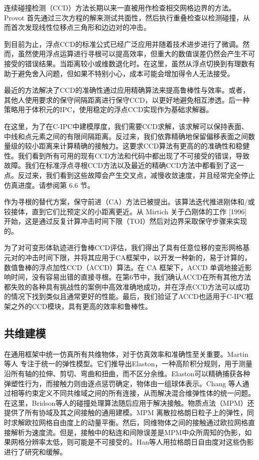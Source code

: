 连续碰撞检测（CCD）方法长期以来一直被用作检查相交网格边界的方法。Provot 首先通过三次方程的解来测试共面性，然后执行重叠检查以检测碰撞，从而首次发现线性位移点三角形和边边对的冲击。

到目前为止，浮点CCD的标准公式已经广泛应用并随着技术进步进行了微调。然而，虽然使用浮点运算进行寻根可以提高效率，但重大的数值误差仍然会产生不可接受的错误结果。当距离较小或维数退化时。在这里，虽然从浮点切换到有理数有助于避免舍入问题，但如果不特别小心，成本可能会增加得令人无法接受。

最近的方法解决了CCD的准确性通过应用精确算法来提高鲁棒性与效率。或者，其他人使用要求的保守间隔距离进行保守CCD，以更好地避免相互渗透。后一种策略用于体积元的IPC，使用稳定的浮点CCD实现作为基础求解器。

在这里，为了在C-IPC中建模厚度，我们需要CCD求解，该求解可以保持表面、中线和点元素之间的有限间隔距离。反过来，我们依靠精确地保留偏移表面之间数量级的较小距离来计算精确的接触力。这要求CCD算法有更高的的准确性和稳健性。我们看到所有可用的现有CCD方法和代码中都出现了不可接受的错误，导致故障。我们在标准浮点寻根CCD方法以及最近的精确CCD方法中都看到了这一点。反过来，我们看到这些故障会产生交叉点，减慢收敛速度，并且经常完全停止仿真进度。请参阅第 6.6 节。

作为寻根的替代方案，保守前进（CA）方法已被提出。该算法迭代推进刚体和/或铰接体，直到它们比预定义的小距离更近。从 Mirtich 关于凸刚体的工作 [1996] 开始，这是通过反复计算冲击时间下限（TOI）然后对边界采取保守步骤来实现的。

为了对可变形体轨迹进行鲁棒CCD评估，我们得出了具有任意位移的变形网格基元对的冲击时间下限，并将其应用于CA框架中，以开发一种新的，易于计算的，数值鲁棒的浮点加性CCD（ACCD）算法。在 CA 框架下，ACCD 单调地接近影响时间，没有容易出错的直接寻根。在第6节中，我们确认ACCD在所有其他方法都失败的各种具有挑战性的案例中高效准确地成功，并在浮点CCD方法可以成功的情况下找到类似且通常更好的性能。最后，我们验证了ACCD也适用于C-IPC框架之外的CCD模块，具有更高的效率和鲁棒性。

\subsection{共维建模}

在通用框架中统一仿真所有共维物体，对于仿真效率和准确性至关重要。Martin 等人 专注于统一的弹性模型。它们推导出Elaston，一种高阶积分规则，用于测量沿所有轴的拉伸、剪切、弯曲和扭曲，而不区分余维。Elaston可以精确捕获各种弹塑性行为，而接触力则由逐点惩罚确定，物体由一组球体表示。Chang 等人通过相等约束定义不同共维域之间的所有连接，从而解决混合维弹性体的统一问题。在这里，Bridson等人的碰撞处理算法随后应用于解决接触。物质点法（MPM）还提供了所有协域及其之间接触的通用建模。MPM 离散拉格朗日粒子上的弹性，同时求解欧拉网格自由度上的动量平衡。然后，同维物体之间的接触通过欧拉网格直接解析为速度流。但是，接触中的粘连和间隙误差是MPM中众所周知的伪影，如果网格分辨率太低，则可能是不可接受的。Han等人用拉格朗日自由度对这些伪影进行了研究和缓解。

